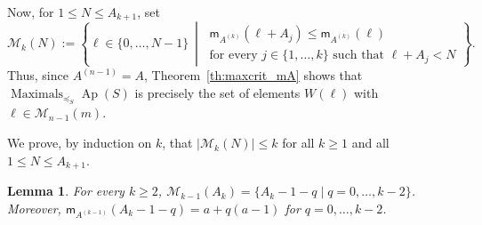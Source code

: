 \documentclass[12pt,a4paper]{amsart}
\newtheorem{lemma}[theorem]{Lemma}
\theoremstyle{definition}
\begin{document}
Now, for $1\le N\le A_{k+1}$, set
\[
\mathcal M_k(N):=
\left\{
\ell\in\{0,\ldots,N-1\}\ \middle|\
\begin{array}{l}
\mathsf m_{A^{(k)}}(\ell+A_j)\le \mathsf m_{A^{(k)}}(\ell)\\
\text{for every } j\in\{1,\ldots,k\}\text{ such that }\ell+A_j<N
\end{array}
\right\}.
\]
Thus, since $A^{(n-1)}=A$, Theorem~\ref{th:maxcrit_mA} shows that $\operatorname{Maximals}_{\preceq_S}\operatorname{Ap}(S)$ is precisely the set of elements $W(\ell)$ with $\ell\in\mathcal M_{n-1}(m)$.

We prove, by induction on $k$, that $|\mathcal M_k(N)|\le k$ for all $k\ge 1$ and all $1\le N\le A_{k+1}$.

\begin{lemma}\label{lem:full-level-maximals}
For every $k\ge 2$, $\mathcal M_{k-1}(A_k)=\{A_k-1-q\mid q=0,\ldots,k-2\}$. Moreover, $\mathsf m_{A^{(k-1)}}(A_k-1-q)=a+q(a-1)$ for $q=0,\ldots,k-2$.
\end{lemma}
\end{document}
